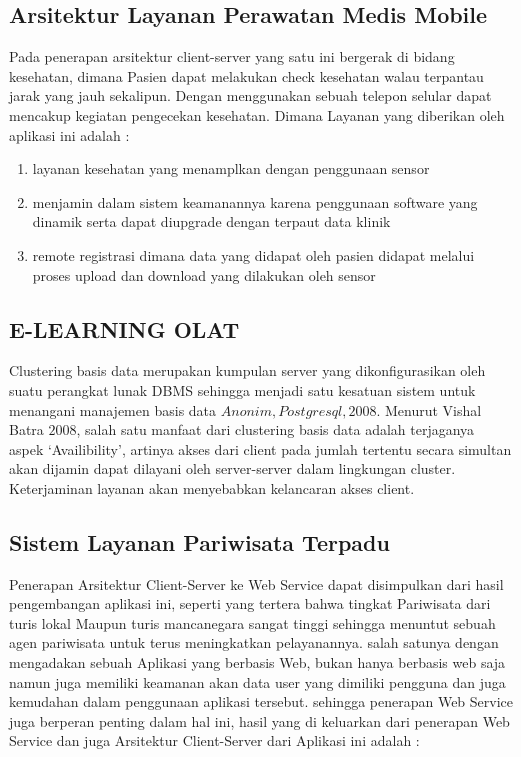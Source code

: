 \subsection{Arsitektur Layanan Perawatan Medis Mobile}
Pada penerapan arsitektur client-server yang satu ini bergerak di bidang kesehatan, dimana Pasien dapat melakukan check kesehatan
walau terpantau jarak yang jauh sekalipun. Dengan menggunakan sebuah telepon selular dapat mencakup kegiatan pengecekan kesehatan.
Dimana Layanan yang diberikan oleh aplikasi ini adalah :
\begin{enumerate}
    \item layanan kesehatan yang menamplkan dengan penggunaan sensor
    \item menjamin dalam sistem keamanannya karena penggunaan software yang dinamik serta dapat diupgrade dengan terpaut data klinik
    \item remote registrasi dimana data yang didapat oleh pasien didapat melalui proses upload dan download yang dilakukan oleh sensor
\end{enumerate}

\subsection{E-LEARNING OLAT} 
Clustering basis data merupakan kumpulan server yang dikonfigurasikan oleh suatu perangkat lunak DBMS sehingga menjadi satu kesatuan sistem 
untuk menangani manajemen basis data \(Anonim, Postgresql, 2008\). Menurut Vishal Batra \(2008\), salah satu manfaat dari clustering basis data 
adalah terjaganya aspek `Availibility', artinya akses dari client pada jumlah tertentu secara simultan akan dijamin dapat dilayani oleh 
server-server dalam lingkungan cluster. Keterjaminan layanan akan menyebabkan kelancaran akses client.

\subsection{Sistem Layanan Pariwisata Terpadu}
Penerapan Arsitektur Client-Server ke Web Service dapat disimpulkan dari hasil pengembangan aplikasi ini, seperti yang tertera bahwa tingkat Pariwisata
dari turis lokal Maupun turis mancanegara sangat tinggi sehingga menuntut sebuah agen pariwisata untuk terus meningkatkan pelayanannya. salah satunya dengan
mengadakan sebuah Aplikasi yang berbasis Web, bukan hanya berbasis web saja namun juga memiliki keamanan akan data user yang dimiliki pengguna dan juga kemudahan
dalam penggunaan aplikasi tersebut. sehingga penerapan Web Service juga berperan penting dalam hal ini, hasil yang di keluarkan dari penerapan Web Service dan juga
Arsitektur Client-Server dari Aplikasi ini adalah :

